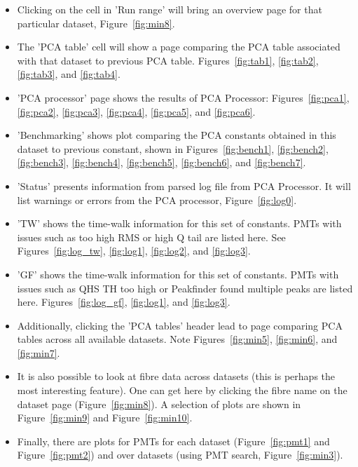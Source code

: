 \documentclass[12pt]{article}
\begin{document}
\begin{itemize}
	\item Clicking on the cell in 'Run range' will bring an overview page for that particular dataset, Figure~\ref{fig:min8}.
	\item The 'PCA table' cell will show a page comparing the PCA table associated with that dataset to previous PCA table. Figures~\ref{fig:tab1}, \ref{fig:tab2}, \ref{fig:tab3}, and \ref{fig:tab4}.
	\item 'PCA processor' page shows the results of PCA Processor: Figures~\ref{fig:pca1}, \ref{fig:pca2}, \ref{fig:pca3}, \ref{fig:pca4}, \ref{fig:pca5}, and \ref{fig:pca6}.
	\item 'Benchmarking' shows plot comparing the PCA constants obtained in this dataset to previous constant, shown in Figures~\ref{fig:bench1}, \ref{fig:bench2}, \ref{fig:bench3}, \ref{fig:bench4}, \ref{fig:bench5}, \ref{fig:bench6}, and \ref{fig:bench7}.
	\item 'Status' presents information from parsed log file from PCA Processor. It will list warnings or errors from the PCA processor, Figure~\ref{fig:log0}.
	\item 'TW' shows the time-walk information for this set of constants. PMTs with issues such as too high RMS or high Q tail are listed here. See Figures~\ref{fig:log_tw}, \ref{fig:log1}, \ref{fig:log2}, and \ref{fig:log3}.
	\item 'GF' shows the time-walk information for this set of constants. PMTs with issues such as QHS TH too high or Peakfinder found multiple peaks are listed here. Figures~\ref{fig:log_gf}, \ref{fig:log1}, and \ref{fig:log3}.
	\item Additionally, clicking the 'PCA tables' header lead to page comparing PCA tables across all available datasets. Note Figures~\ref{fig:min5}, \ref{fig:min6}, and \ref{fig:min7}.
	\item It is also possible to look at fibre data across datasets (this is perhaps the most interesting feature). One can get here by clicking the fibre name on the dataset page (Figure~\ref{fig:min8}). A selection of plots are shown in Figure~\ref{fig:min9} and Figure~\ref{fig:min10}.
	\item Finally, there are plots for PMTs for each dataset (Figure~\ref{fig:pmt1} and Figure~\ref{fig:pmt2}) and over datasets (using PMT search, Figure~\ref{fig:min3}).
\end{itemize}

\clearpage
\end{document}
